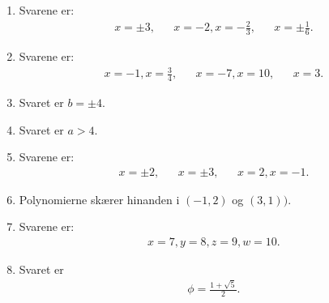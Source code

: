 \begin{enumerate}
\item Svarene er: 
\begin{align*}
x=\pm 3, && x=-2,x=-\frac{2}{3},&& x=\pm \frac{1}{6}.
\end{align*}

\item Svarene er:
\begin{align*}
 x=-1,x=\frac{3}{4},&& x=-7,x=10,&&x=3.
\end{align*}

\item Svaret er $b=\pm 4$.

\item Svaret er $a>4$.

\item Svarene er:
\begin{align*}
x=\pm 2,&& x=\pm 3,&& x=2,x=-1.
\end{align*}



\item \label{it:2polyans} Polynomierne skærer hinanden i $(-1,2)$ og $(3,1))$.

\item Svarene er:
\begin{align*}
x=7,y=8,z=9,w=10.
\end{align*}

\item \label{it:phians} Svaret er
\begin{align*}
\phi=\frac{1+\sqrt{5}}{2}.
\end{align*}

%


\end{enumerate}
